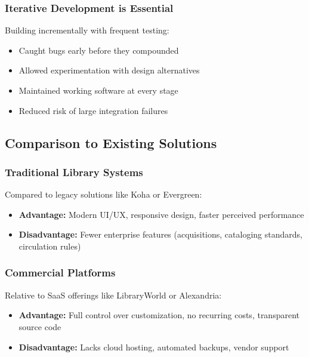\documentclass[12pt,a4paper]{article}
\begin{document}
\subsubsection{Iterative Development is Essential}

Building incrementally with frequent testing:

\begin{itemize}[leftmargin=*]
    \item Caught bugs early before they compounded
    \item Allowed experimentation with design alternatives
    \item Maintained working software at every stage
    \item Reduced risk of large integration failures
\end{itemize}

\subsection{Comparison to Existing Solutions}

\subsubsection{Traditional Library Systems}

Compared to legacy solutions like Koha or Evergreen:

\begin{itemize}[leftmargin=*]
    \item \textbf{Advantage:} Modern UI/UX, responsive design, faster perceived performance
    \item \textbf{Disadvantage:} Fewer enterprise features (acquisitions, cataloging standards, circulation rules)
\end{itemize}

\subsubsection{Commercial Platforms}

Relative to SaaS offerings like LibraryWorld or Alexandria:

\begin{itemize}[leftmargin=*]
    \item \textbf{Advantage:} Full control over customization, no recurring costs, transparent source code
    \item \textbf{Disadvantage:} Lacks cloud hosting, automated backups, vendor support
\end{itemize}
\end{document}
